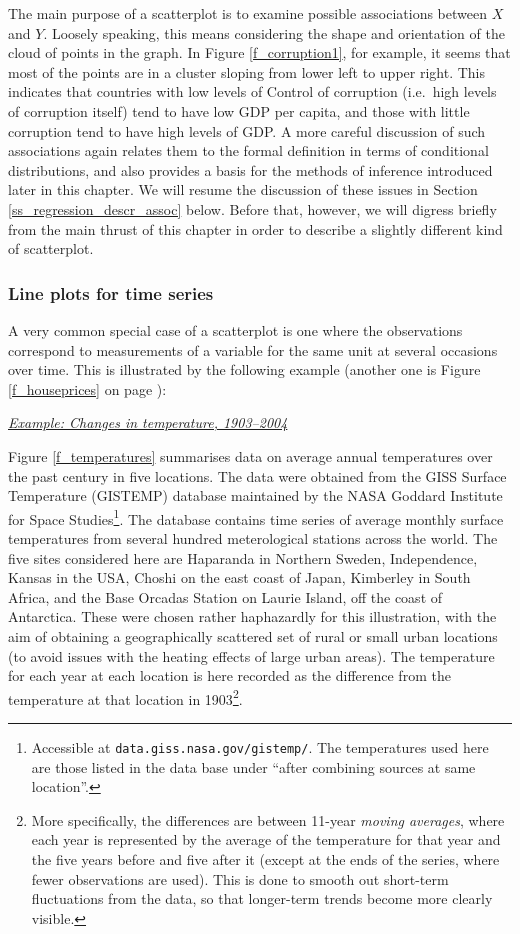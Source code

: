 The main purpose of a scatterplot is to examine possible associations
between $X$ and $Y$. Loosely speaking, this means considering the shape
and orientation of the cloud of points in the graph. In Figure
\ref{f_corruption1}, for example, it seems that most of the points are
in a cluster sloping from lower left to upper right. This indicates that
countries with low levels of Control of corruption (i.e.\ high levels of
corruption itself) tend to have low GDP per capita, and those with
little corruption tend to have high levels of GDP. A more careful
discussion of such associations again relates them to the formal definition
in terms of conditional distributions, and also provides a basis for the
methods of inference introduced later in this chapter. We will resume
the discussion of these issues in Section
\ref{ss_regression_descr_assoc} below. Before that, however, we will
digress briefly from the main thrust of this chapter in order to
describe a slightly different kind of scatterplot.

\subsubsection{Line plots for time series}

A very common special case of a scatterplot is
one where the observations correspond to measurements of a variable for
the same unit at several occasions over time. This is illustrated by the
following example (another one is Figure \ref{f_houseprices} on page
\pageref{f_houseprices}):

\underline{\emph{Example: Changes in temperature, 1903--2004}}

Figure \ref{f_temperatures} summarises data on average annual
temperatures over the past century in five locations. The data were
obtained from the GISS Surface Temperature (GISTEMP) database maintained
by the NASA Goddard Institute for Space Studies\footnote{Accessible at
\texttt{data.giss.nasa.gov/gistemp/}. The temperatures used
here are those listed in the data base under ``after combining sources
at same location''.}. The database contains time series of average
monthly surface temperatures from several hundred meterological stations
across the world. The five sites considered here are Haparanda in
Northern Sweden, Independence, Kansas in the USA, Choshi on the east
coast of Japan, Kimberley in South Africa, and the Base Orcadas Station
on Laurie Island, off the coast of Antarctica. These were chosen rather
haphazardly for this illustration, with the aim of obtaining a
geographically scattered set of rural or small urban locations (to avoid
issues with the heating effects of large urban areas). The temperature
for each year at each location is here recorded as the difference from the
temperature at that location in 1903\footnote{More specifically, the differences
are between 11-year \emph{moving averages}, where each year is
represented by the average of the temperature for that year and the five
years before and five after it (except at the ends of the series, where
fewer observations are used). This is done to smooth out short-term
fluctuations from the data, so that longer-term trends become more
clearly visible.}.


